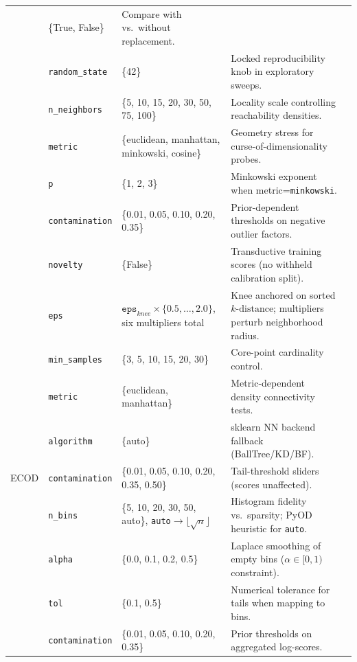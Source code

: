 \documentclass[cameraready]{Interspeech}
\begin{document}
\begin{table}[!ht]
\begin{tabularx}{\textwidth}{>{\raggedright\arraybackslash}p{1.35cm} >{\raggedright\arraybackslash}p{2.45cm} >{\raggedright\arraybackslash}p{2.95cm} >{\raggedright\arraybackslash}X >{\centering\arraybackslash}p{1.05cm}}
& \{True, False\}
& Compare with vs.\ without replacement.
& \\
& \texttt{random\_state}
& \{42\}
& Locked reproducibility knob in exploratory sweeps.
& \\
\midrule
\multirow{5}{*}{LOF}
& \texttt{n\_neighbors}
& \{5, 10, 15, 20, 30, 50, 75, 100\}
& Locality scale controlling reachability densities.
& \multirow{5}{*}{480} \\
& \texttt{metric}
& \{euclidean, manhattan, minkowski, cosine\}
& Geometry stress for curse-of-dimensionality probes.
& \\
& \texttt{p}
& \{1, 2, 3\}
& Minkowski exponent when metric=\texttt{minkowski}.
& \\
& \texttt{contamination}
& \{0.01, 0.05, 0.10, 0.20, 0.35\}
& Prior-dependent thresholds on negative outlier factors.
& \\
& \texttt{novelty}
& \{False\}
& Transductive training scores (no withheld calibration split).
& \\
\midrule
\multirow{4}{*}{DBSCAN}
& \texttt{eps}
& \(\texttt{eps}_{knee}\times\{0.5,\dots,2.0\}\), six multipliers total
& Knee anchored on sorted \(k\text{-distance}\); multipliers perturb neighborhood radius.
& \multirow{4}{*}{72} \\
& \texttt{min\_samples}
& \{3, 5, 10, 15, 20, 30\}
& Core-point cardinality control.
& \\
& \texttt{metric}
& \{euclidean, manhattan\}
& Metric-dependent density connectivity tests.
& \\
& \texttt{algorithm}
& \{auto\}
& sklearn NN backend fallback (BallTree/KD/BF).
& \\
\midrule
ECOD
& \texttt{contamination}
& \{0.01, 0.05, 0.10, 0.20, 0.35, 0.50\}
& Tail-threshold sliders (scores unaffected).
& 6 \\
\midrule
\multirow{4}{*}{HBOS}
& \texttt{n\_bins}
& \{5, 10, 20, 30, 50, auto\}, \texttt{auto}\(\rightarrow\lfloor\sqrt{n}\rfloor\)
& Histogram fidelity vs.\ sparsity; PyOD heuristic for \texttt{auto}.
& \multirow{4}{*}{240} \\
& \texttt{alpha}
& \{0.0, 0.1, 0.2, 0.5\}
& Laplace smoothing of empty bins (\(\alpha\in[0,1)\) constraint).
& \\
& \texttt{tol}
& \{0.1, 0.5\}
& Numerical tolerance for tails when mapping to bins.
& \\
& \texttt{contamination}
& \{0.01, 0.05, 0.10, 0.20, 0.35\}
& Prior thresholds on aggregated log-scores.
& \\
\bottomrule
\end{tabularx}
\end{table}
\end{document}
